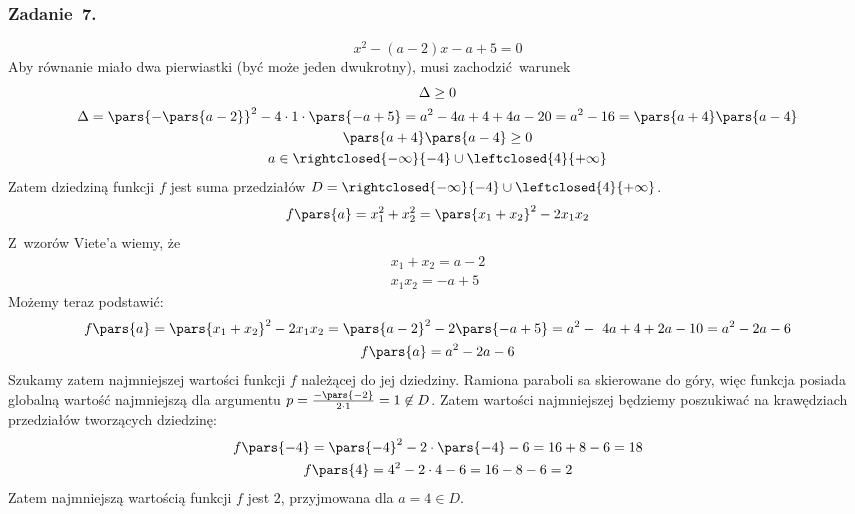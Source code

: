 \subsubsection*{Zadanie~7.}
\begin{equation*}
    x^2 - (a - 2)x - a + 5 = 0
\end{equation*}
Aby równanie miało dwa pierwiastki (być może jeden dwukrotny), musi zachodzić warunek
\begin{gather*}
    \Delta \geq 0\\
    \Delta = \pars{-\pars{a - 2}}^2 - 4 \cdot 1 \cdot \pars{-a + 5}
        = a^2 - 4a + 4 + 4a - 20
        = a^2 - 16
        = \pars{a + 4}\pars{a - 4}\\
    \pars{a + 4}\pars{a - 4} \geq 0\\
    a \in \rightclosed{-\infty}{-4} \cup \leftclosed{4}{+\infty}
\end{gather*}
Zatem dziedziną funkcji \(f\) jest suma przedziałów \(D = \rightclosed{-\infty}{-4} \cup \leftclosed{4}{+\infty}\).
\begin{equation*}
    f\pars{a}
        = x_1^2 + x_2^2
        = \pars{x_1 + x_2}^2 - 2x_1x_2
\end{equation*}
Z~wzorów Viete'a wiemy, że
\begin{gather*}
    x_1 + x_2 = a - 2\\
    x_1x_2 = -a + 5
\end{gather*}
Możemy teraz podstawić:
\begin{gather*}
    f\pars{a}
        = \pars{x_1 + x_2}^2 - 2x_1x_2
        = \pars{a - 2}^2 - 2\pars{-a + 5}
        = a^2 - 4a + 4 + 2a - 10
        = a^2 - 2a - 6\\
    f\pars{a} = a^2 - 2a - 6
\end{gather*}
Szukamy zatem najmniejszej wartości funkcji \(f\) należącej do jej dziedziny. Ramiona paraboli sa skierowane do góry, więc funkcja posiada globalną wartość najmniejszą dla argumentu \(p = \frac{-\pars{-2}}{2 \cdot 1} = 1 \not\in D\). Zatem wartości najmniejszej będziemy poszukiwać na krawędziach przedziałów tworzących dziedzinę:
\begin{gather*}
    f\pars{-4} = \pars{-4}^2 - 2 \cdot \pars{-4} - 6 = 16 + 8 - 6 = 18\\
    f\pars{4} = 4^2 - 2 \cdot 4 - 6 = 16 - 8 - 6 = 2
\end{gather*}
Zatem najmniejszą wartością funkcji \(f\) jest \(2\), przyjmowana dla \(a = 4 \in D\).
